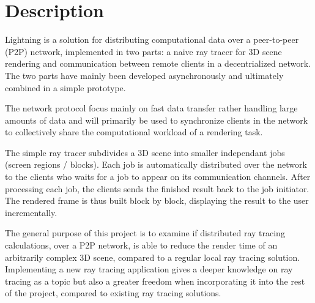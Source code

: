 \chapter{Description}


Lightning is a solution for distributing computational data over a peer-to-peer (P2P) network, implemented in two parts: a naive ray tracer for 3D scene rendering and communication between remote clients in a decentrialized network. The two parts have mainly been developed asynchronously and ultimately combined in a simple prototype. 

The network protocol focus mainly on fast data transfer rather handling large amounts of data and will primarily be used to synchronize clients in the network to collectively share the computational workload of a rendering task.

The simple ray tracer subdivides a 3D scene into smaller independant jobs (screen regions / blocks). Each job is automatically distributed over the network to the clients who waits for a job to appear on its communication channels. After processing each job, the clients sends the finished result back to the job initiator. The rendered frame is thus built block by block, displaying the result to the user incrementally. 

The general purpose of this project is to examine if distributed ray tracing calculations, over a P2P network, is able to reduce the render time of an arbitrarily complex 3D scene, compared to a regular local ray tracing solution. Implementing a new ray tracing application gives a deeper knowledge on ray tracing as a topic but also a greater freedom when incorporating it into the rest of the project, compared to existing ray tracing solutions.

